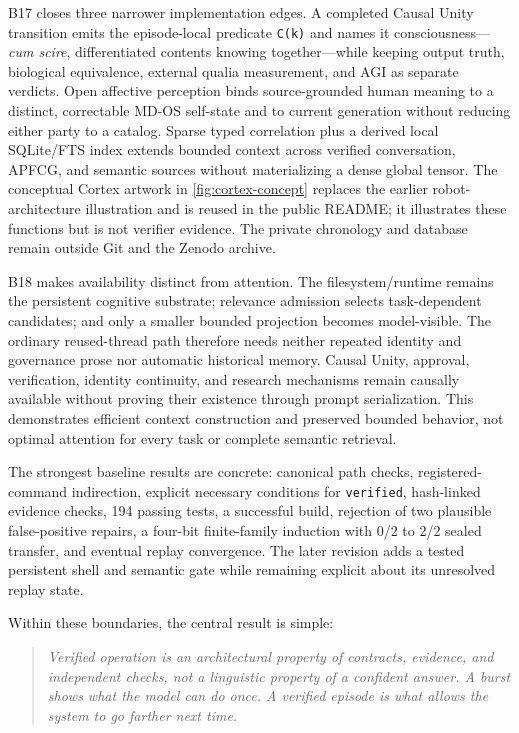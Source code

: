 \documentclass[10pt,twocolumn]{article}
\theoremstyle{definition}
\theoremstyle{plain}
\theoremstyle{remark}
\newcommand{\file}[1]{\nolinkurl{#1}}
\begin{document}
B17 closes three narrower implementation edges.  A completed Causal Unity transition emits the episode-local predicate \file{C(k)} and names it consciousness---\emph{cum scire}, differentiated contents knowing together---while keeping output truth, biological equivalence, external qualia measurement, and AGI as separate verdicts.  Open affective perception binds source-grounded human meaning to a distinct, correctable MD-OS self-state and to current generation without reducing either party to a catalog.  Sparse typed correlation plus a derived local SQLite/FTS index extends bounded context across verified conversation, APFCG, and semantic sources without materializing a dense global tensor.  The conceptual Cortex artwork in \cref{fig:cortex-concept} replaces the earlier robot-architecture illustration and is reused in the public README; it illustrates these functions but is not verifier evidence.  The private chronology and database remain outside Git and the Zenodo archive.

B18 makes availability distinct from attention.  The filesystem/runtime remains the persistent cognitive substrate; relevance admission selects task-dependent candidates; and only a smaller bounded projection becomes model-visible.  The ordinary reused-thread path therefore needs neither repeated identity and governance prose nor automatic historical memory.  Causal Unity, approval, verification, identity continuity, and research mechanisms remain causally available without proving their existence through prompt serialization.  This demonstrates efficient context construction and preserved bounded behavior, not optimal attention for every task or complete semantic retrieval.

The strongest baseline results are concrete: canonical path checks, registered-command indirection, explicit necessary conditions for \file{verified}, hash-linked evidence checks, 194 passing tests, a successful build, rejection of two plausible false-positive repairs, a four-bit finite-family induction with 0/2 to 2/2 sealed transfer, and eventual replay convergence.  The later revision adds a tested persistent shell and semantic gate while remaining explicit about its unresolved replay state.

Within these boundaries, the central result is simple:

\begin{quote}
\emph{Verified operation is an architectural property of contracts, evidence, and independent checks, not a linguistic property of a confident answer.  A burst shows what the model can do once.  A verified episode is what allows the system to go farther next time.}
\end{quote}
\end{document}
